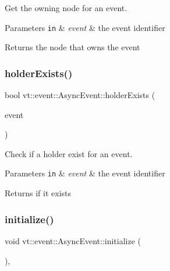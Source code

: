 Get the owning node for an event. 


\begin{DoxyParams}[1]{Parameters}
\mbox{\tt in}  & {\em event} & the event identifier\\
\hline
\end{DoxyParams}
\begin{DoxyReturn}{Returns}
the node that owns the event 
\end{DoxyReturn}
\mbox{\label{structvt_1_1event_1_1_async_event_a8aeeb83c7b467b3d130e522d079e5a7d}} 
\subsubsection{\texorpdfstring{holder\+Exists()}{holderExists()}}
{\footnotesize\ttfamily bool vt\+::event\+::\+Async\+Event\+::holder\+Exists (\begin{DoxyParamCaption}\item[{\hyperlink{namespacevt_a009267401def7ae8bf201892222d060f}{Event\+Type} const \&}]{event }\end{DoxyParamCaption})}



Check if a holder exist for an event. 


\begin{DoxyParams}[1]{Parameters}
\mbox{\tt in}  & {\em event} & the event identifier\\
\hline
\end{DoxyParams}
\begin{DoxyReturn}{Returns}
if it exists 
\end{DoxyReturn}
\mbox{\label{structvt_1_1event_1_1_async_event_ac8d9f977b1cca3f43a06d0e83bc88e3d}} 
\subsubsection{\texorpdfstring{initialize()}{initialize()}}
{\footnotesize\ttfamily void vt\+::event\+::\+Async\+Event\+::initialize (\begin{DoxyParamCaption}{ }\end{DoxyParamCaption})\hspace{0.3cm}{\ttfamily [override]}, {\ttfamily [virtual]}}



